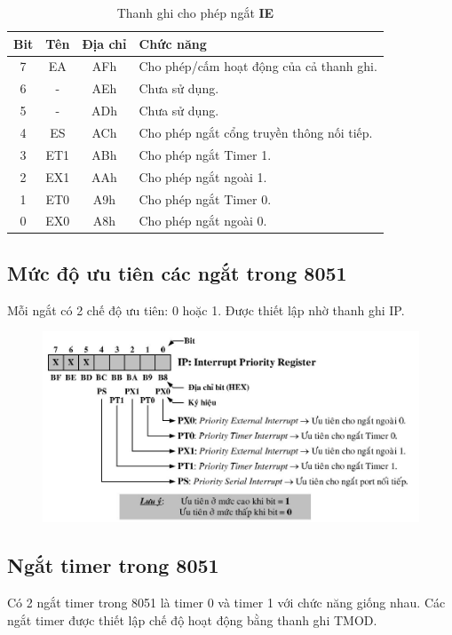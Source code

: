 \documentclass[../report.tex]{subfiles}
\begin{document}
\begin{table}[H]
\centering
\begin{tabular}{|c|c|c|l|}
\hline
\textbf{Bit} & \textbf{Tên} & \textbf{Địa chỉ} & \textbf{Chức năng} \\
\hline
7 & EA & AFh & Cho phép/cấm hoạt động của cả thanh ghi.  \\
\hline
6 & - & AEh & Chưa sử dụng.  \\
\hline
5 & - & ADh & Chưa sử dụng. \\
\hline
4 & ES & ACh & Cho phép ngắt cổng truyền thông nối tiếp. \\
\hline
3 & ET1 & ABh & Cho phép ngắt Timer 1. \\
\hline
2 & EX1 & AAh & Cho phép ngắt ngoài 1. \\
\hline
1 & ET0 & A9h & Cho phép ngắt Timer 0. \\
\hline
0 & EX0 & A8h & Cho phép ngắt ngoài 0. \\ 
\hline
\end{tabular}
\caption{Thanh ghi cho phép ngắt \textbf{IE}}
\end{table}
\subsection{Mức độ ưu tiên các ngắt trong 8051}
Mỗi ngắt có 2 chế độ ưu tiên: 0 hoặc 1. Được thiết lập nhờ thanh ghi IP. 
\begin{figure}[H]
\centering
\includegraphics[width=12cm]{figures/ip-register.jpg}
\end{figure}

\subsection{Ngắt timer trong 8051}
Có 2 ngắt timer trong 8051 là timer 0 và timer 1 với chức năng giống nhau. 
Các ngắt timer được thiết lập chế độ hoạt động bằng thanh ghi TMOD.
\end{document}
